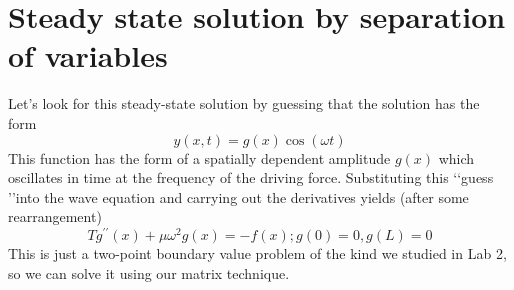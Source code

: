 \section*{Steady state solution by separation of variables}
Let\rq s look for this steady-state solution by guessing that the solution has the form
\begin{equation}\label{eq:32}
		y(x,t) = g(x)\cos(\omega t)
				\end{equation}
				This function has the form of a spatially dependent amplitude $g (x)$ which oscillates in time at the frequency of the driving force. Substituting this \lq\lq guess \rq\rq into the
wave equation and carrying out the derivatives yields (after some rearrangement)
\begin{equation}\label{eq:33}
		Tg^{\prime\prime}(x) + \mu \omega ^ 2 g(x) = -f(x) ; g(0) = 0, g(L) = 0
				\end{equation}
				This is just a two-point boundary value problem of the kind we studied in Lab 2,
so we can solve it using our matrix technique.
